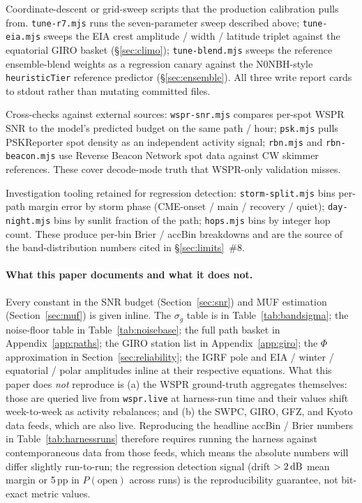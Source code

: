 \documentclass[11pt,a4paper]{article}
\newcommand{\SI}[2]{#1\,\text{#2}}
\newcommand{\dB}{\text{dB}}
\begin{document}
\begin{description}[nosep]
  \item[Tune suites.] Coordinate-descent or grid-sweep scripts
    that the production calibration pulls from.
    \texttt{tune-r7.mjs} runs the seven-parameter sweep
    described above; \texttt{tune-eia.mjs} sweeps the EIA crest
    amplitude / width / latitude triplet against the equatorial
    GIRO basket (\S\ref{sec:climo}); \texttt{tune-blend.mjs}
    sweeps the reference ensemble-blend weights as a regression
    canary against the N0NBH-style \texttt{heuristicTier}
    reference predictor
    (\S\ref{sec:ensemble}).  All three write report cards to
    stdout rather than mutating committed files.
  \item[Validation suites.] Cross-checks against external
    sources: \texttt{wspr-snr.mjs} compares per-spot WSPR SNR
    to the model's predicted budget on the same path / hour;
    \texttt{psk.mjs} pulls PSKReporter spot density as an
    independent activity signal; \texttt{rbn.mjs} and
    \texttt{rbn-beacon.mjs} use Reverse Beacon Network spot data
    against CW skimmer references.  These cover decode-mode
    truth that WSPR-only validation misses.
  \item[Diagnostic suites.] Investigation tooling
    retained for regression detection: \texttt{storm-split.mjs}
    bins per-path margin error by storm phase (CME-onset / main
    / recovery / quiet); \texttt{day-night.mjs} bins by sunlit
    fraction of the path; \texttt{hops.mjs} bins by integer hop
    count.  These produce per-bin Brier / accBin breakdowns and
    are the source of the band-distribution numbers cited in
    \S\ref{sec:limits}~\#8.
\end{description}

\paragraph{What this paper documents and what it does not.}  Every
constant in the SNR budget (Section~\ref{sec:snr}) and MUF
estimation (Section~\ref{sec:muf}) is given inline.  The
$\sigma_g$ table is in Table~\ref{tab:bandsigma}; the noise-floor
table in Table~\ref{tab:noisebase}; the full path basket in
Appendix~\ref{app:paths}; the GIRO station list in
Appendix~\ref{app:giro}; the $\Phi$ approximation in
Section~\ref{sec:reliability}; the IGRF pole and
EIA / winter / equatorial / polar amplitudes inline at their
respective equations.  What this paper does \emph{not} reproduce
is (a) the WSPR ground-truth aggregates themselves: those are
queried live from \texttt{wspr.live} at harness-run time and
their values shift week-to-week as activity rebalances; and
(b) the SWPC, GIRO, GFZ, and Kyoto data feeds, which are also
live.  Reproducing the headline accBin / Brier numbers in
Table~\ref{tab:harnessruns} therefore requires running the harness
against contemporaneous data from those feeds, which means the
absolute numbers will differ slightly run-to-run; the regression
detection signal (drift $> \SI{2}{\dB}$ mean margin or 5\,pp in
$P(\text{open})$ across runs) is the reproducibility guarantee,
not bit-exact metric values.
\end{document}
